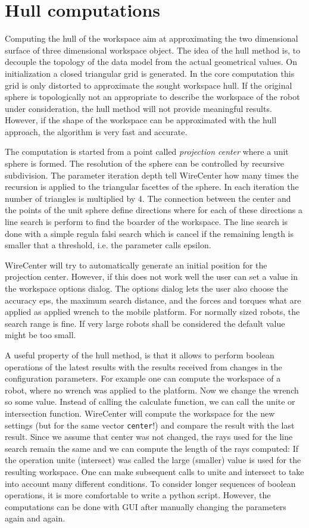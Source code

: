 \documentclass[11pt,a4paper,onepage,openany]{book}
\begin{document}
\section{Hull computations}
Computing the hull of the workspace aim at approximating the two dimensional
surface of three dimensional workspace object. The idea of the hull method is,
to decouple the topology of the data model from the actual geometrical values.
On initialization a closed triangular grid is generated. In the core
computation this grid is only distorted to approximate the sought workspace
hull. If the original sphere is topologically not an appropriate to describe
the workspace of the robot under consideration, the hull method will not
provide meaningful results. However, if the shape of the workspace can be
approximated with the hull approach, the algorithm is very fast and accurate.

The computation is started from a point called \emph{projection center} where a
unit sphere is formed. The resolution of the sphere can be controlled by
recursive subdivision. The parameter iteration depth tell WireCenter how many
times the recursion is applied to the triangular facettes of the sphere. In
each iteration the number of triangles is multiplied by 4. The connection
between the center and the points of the unit sphere define directions where
for each of these directions a line search is perform to find the boarder of
the workspace. The line search is done with a simple regula falsi search which
is cancel if the remaining length is smaller that a threshold, i.e. the
parameter calls epsilon.

WireCenter will try to automatically generate an initial position for the
projection center. However, if this does not work well the user can set a value
in the workspace options dialog. The options dialog lets the user also choose
the accuracy eps, the maximum search distance, and the forces and torques what
are applied as applied wrench to the mobile platform. For normally sized
robots, the search range is fine. If very large robots shall be considered the
default value might be too small.

A useful property of the hull method, is that it allows to perform boolean
operations of the latest results with the results received from changes in the
configuration parameters. For example one can compute the workspace of a robot,
where no wrench was applied to the platform. Now we change the wrench so some
value. Instead of calling the calculate function, we can call the unite or
intersection function. WireCenter will compute the workspace for the new
settings (but for the same vector \texttt{center}!) and compare the result with
the last result. Since we assume that center was not changed, the rays used for
the line search remain the same and we can compute the length of the rays
computed: If the operation unite (intersect) was called the large (smaller)
value is used for the resulting workspace. One can make subsequent calls to
unite and intersect to take into account many different conditions. To consider
longer sequences of boolean operations, it is more comfortable to write a
python script. However, the computations can be done with GUI after manually
changing the parameters again and again.
\end{document}
